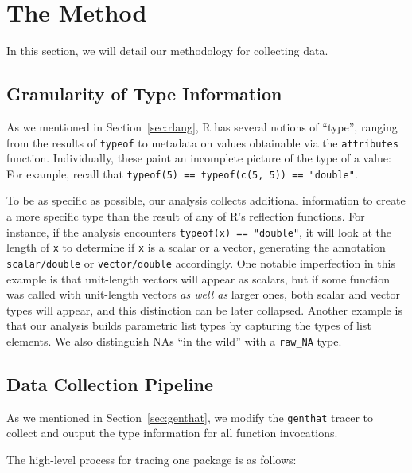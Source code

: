 \documentclass[acmsmall,10pt,review,anonymous]{acmart}\settopmatter{printfolios=true,printccs=false,printacmref=false}
\newcommand{\code}[1]{\lstinline|#1|\xspace}
\begin{document}
\section{The Method}

In this section, we will detail our methodology for collecting data.

%
%
%
%
\subsection{Granularity of Type Information}

As we mentioned in Section~\ref{sec:rlang}, R has several notions of ``type'', ranging from the results of \code{typeof} to metadata on values obtainable via the \code{attributes} function.
Individually, these paint an incomplete picture of the type of a value:
For example, recall that \code{typeof(5) == typeof(c(5, 5)) == "double"}.

To be as specific as possible, our analysis collects additional information to create a more specific type than the result of any of R's reflection functions.
For instance, if the analysis encounters {\tt typeof(x) == "double"}, it will look at the length of {\tt x} to determine if {\tt x} is a scalar or a vector, generating the annotation {\tt scalar/double} or {\tt vector/double} accordingly. 
One notable imperfection in this example is that unit-length vectors will appear as scalars, but if some function was called with unit-length vectors {\it as well as} larger ones, both scalar and vector types will appear, and this distinction can be later collapsed.
Another example is that our analysis builds parametric list types by capturing the types of list elements.
We also distinguish NAs ``in the wild'' with a {\tt raw\_NA} type.

%
%
%
%
\subsection{Data Collection Pipeline}

As we mentioned in Section~\ref{sec:genthat}, we modify the {\tt genthat} tracer to collect and output the type information for all function invocations.

The high-level process for tracing one package is as follows:
\end{document}
